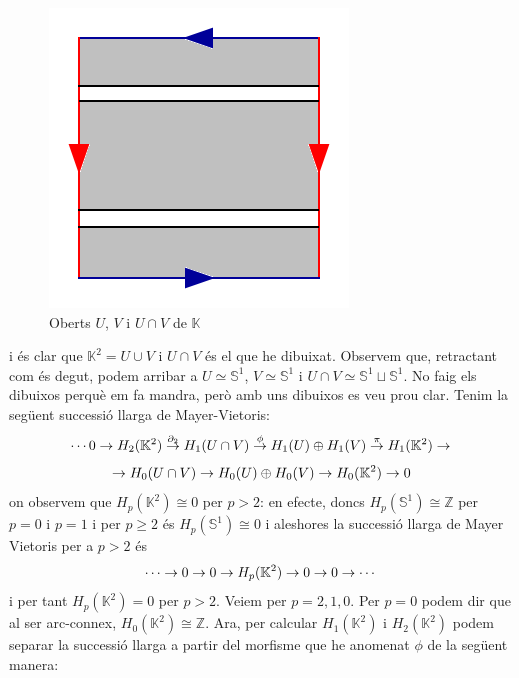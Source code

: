 \documentclass[../main.tex]{subfiles}
\begin{document}
\begin{sol}
\begin{figure}[H]
    \includegraphics[scale = 0.25]{pictures/kleinUcapV.png}
    \caption{Oberts $U$, $V$ i $U\cap V$ de $\mathbb{K}$}
    \label{fig:obertsklein}
\end{figure}
i és clar que $\mathbb{K}^2 = U\cup V$ i $U\cap V$ és el que he dibuixat. Observem que, retractant com és degut, podem arribar a $U\simeq \mathbb{S}^1$, $V\simeq \mathbb{S}^1$ i $U\cap V\simeq \mathbb{S}^1\sqcup \mathbb{S}^1$. No faig els dibuixos perquè em fa mandra, però amb uns dibuixos es veu prou clar. Tenim la següent successió llarga de Mayer-Vietoris:
\begin{equation}
    \notag
    \cdots 0\rightarrow H_2(\mathbb{K}^2)\overset{\partial_2}{\rightarrow}H_1(U\cap V)\overset{\phi}{\rightarrow} H_1(U)\oplus H_1(V)\overset{\pi}{\rightarrow} H_1(\mathbb{K}^2)\rightarrow
\end{equation}
\begin{equation}
    \notag
    \rightarrow H_0(U\cap V)\rightarrow H_0(U)\oplus H_0(V)\rightarrow H_0(\mathbb{K}^2)\rightarrow 0
\end{equation}
on observem que $H_p(\mathbb{K}^2)\cong 0$ per $p>2$: en efecte, doncs $H_p(\mathbb{S}^1)\cong \mathbb{Z}$ per $p = 0$ i $p = 1$ i per $p \geq 2$ és $H_p(\mathbb{S}^1)\cong 0$ i aleshores la successió llarga de Mayer Vietoris per a $p>2$ és
\begin{equation}
    \notag
    \cdots\rightarrow 0\rightarrow 0\rightarrow H_p(\mathbb{K}^2)\rightarrow 0\rightarrow0\rightarrow\cdots
\end{equation}
i per tant $H_p(\mathbb{K}^2) =0$ per $p>2$. Veiem per $p = 2,1,0$. Per $p = 0$ podem dir que al ser arc-connex, $H_0(\mathbb{K}^2) \cong \mathbb{Z}$. Ara, per calcular $H_1(\mathbb{K}^2)$ i $H_2(\mathbb{K}^2)$ podem separar la successió llarga a partir del morfisme que he anomenat $\phi$ de la següent manera:

\end{sol}
\end{document}
